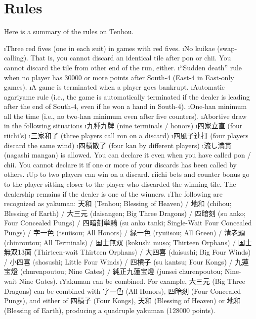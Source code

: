 \section{Rules}
Here is a summary of the rules on {\jap Tenhou}.

\bi
\i Three red fives (one in each suit) in games with red fives.
\i No {\jap kuikae} (swap-calling). That is, you cannot discard an identical tile after {\jap pon} or {\jap chii}. You cannot discard the tile from other end of the run, either.
\i ``Sudden death'' rule when no player has 30000 or more points after South-4 (East-4 in East-only games).
\i A game is terminated when a player goes bankrupt.
\i Automatic {\jap agariyame} rule (i.e., the game is automatically terminated if the dealer is leading after the end of South-4, even if he won a hand in South-4).
\i One-{\jap han} minimum all the time (i.e., no two-{\jap han} minimum even after five counters).
\i Abortive draw in the following situations
	\bi
	\i 九種九牌 (nine terminals / honors)
	\i 四家立直 (four riichi's)
	\i 三家和了 (three players call {\jap ron} on a discard)
	\i 四風子連打 (four players discard the same wind)
	\i 四槓散了 (four {\jap kan} by different players)
	\ei
\i 流し満貫 ({\jap nagashi mangan}) is allowed. You can declare it even when you have called {\jap pon} / {\jap chii}. You cannot declare it if one or more of your discards has been called by others.
\i Up to two players can win on a discard. riichi bets and counter bonus go to the player sitting closer to the player who discarded the winning tile. The dealership remains if the dealer is one of the winners.
\i The following are recognized as {\jap yakuman}:
天和 ({\jap Tenhou}; Blessing of Heaven) / 地和 ({\jap chihou}; Blessing of Earth) / 大三元 ({\jap daisangen}; Big Three Dragons) / 四暗刻 ({\jap su anko}; Four Concealed Pungs) / 四暗刻単騎 ({\jap su anko tanki}; Single-Wait Four Concealed Pungs) / 字一色 ({\jap tsuiisou}; All Honors) / 緑一色 ({\jap ryuiisou}; All Green) / 清老頭 ({\jap chinroutou}; All Terminals) / 国士無双 ({\jap kokushi muso}; Thirteen Orphans) / 国士無双13面 (Thirteen-wait Thirteen Orphans) / 大四喜 ({\jap daisushi}; Big Four Winds) / 小四喜 ({\jap shosushi}; Little Four Winds) / 四槓子 ({\jap su kantsu}; Four Kongs) / 九蓮宝燈 ({\jap churenpoutou}; Nine Gates) / 純正九蓮宝燈 ({\jap junsei churenpoutou}; Nine-wait Nine Gates).
\i {\jap Yakuman} can be combined. For example, 大三元 (Big Three Dragons) can be combined with 字一色 (All Honors), 四暗刻 (Four Concealed Pungs), and either of 四槓子 (Four Kongs), 天和 (Blessing of Heaven) or 地和 (Blessing of Earth), producing a quadruple {\jap yakuman} (128000 points).
